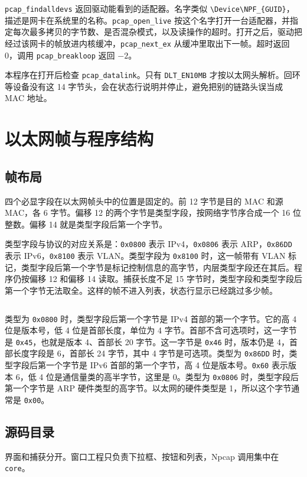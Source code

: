 \documentclass[10.5pt,a4paper,UTF8]{article}
\begin{document}
\texttt{pcap\_findalldevs} 返回驱动能看到的适配器。名字类似 \texttt{\textbackslash Device\textbackslash NPF\_\{GUID\}}，描述是网卡在系统里的名称。\texttt{pcap\_open\_live} 按这个名字打开一台适配器，并指定每次最多拷贝的字节数、是否混杂模式，以及读操作的超时。打开之后，驱动把经过该网卡的帧放进内核缓冲，\texttt{pcap\_next\_ex} 从缓冲里取出下一帧。超时返回 0，调用 \texttt{pcap\_breakloop} 返回 $-2$。

本程序在打开后检查 \texttt{pcap\_datalink}。只有 \texttt{DLT\_EN10MB} 才按以太网头解析。回环等设备没有这 14 字节头，会在状态行说明并停止，避免把别的链路头误当成 MAC 地址。

\section{以太网帧与程序结构}
\subsection{帧布局}
四个必显字段在以太网帧头中的位置是固定的。前 12 字节是目的 MAC 和源 MAC，各 6 字节。偏移 12 的两个字节是类型字段，按网络字节序合成一个 16 位整数。偏移 14 就是类型字段后第一个字节。

类型字段与协议的对应关系是：\texttt{0x0800} 表示 IPv4，\texttt{0x0806} 表示 ARP，\texttt{0x86DD} 表示 IPv6，\texttt{0x8100} 表示 VLAN。类型字段为 \texttt{0x8100} 时，这一帧带有 VLAN 标记，类型字段后第一个字节是标记控制信息的高字节，内层类型字段还在其后。程序仍按偏移 12 和偏移 14 读取。捕获长度不足 15 字节时，类型字段和类型字段后第一个字节无法取全。这样的帧不进入列表，状态行显示已经跳过多少帧。

\inputminted[firstline=7,lastline=22,linenos,firstnumber=7]{cpp}{core/ethernet.cpp}

类型为 \texttt{0x0800} 时，类型字段后第一个字节是 IPv4 首部的第一个字节。它的高 4 位是版本号，低 4 位是首部长度，单位为 4 字节。首部不含可选项时，这一字节是 \texttt{0x45}，也就是版本 4、首部长 20 字节。这一字节是 \texttt{0x46} 时，版本仍是 4，首部长度字段是 6，首部长 24 字节，其中 4 字节是可选项。类型为 \texttt{0x86DD} 时，类型字段后第一个字节是 IPv6 首部的第一个字节，高 4 位是版本号。\texttt{0x60} 表示版本 6，低 4 位是通信量类的高半字节，这里是 0。类型为 \texttt{0x0806} 时，类型字段后第一个字节是 ARP 硬件类型的高字节。以太网的硬件类型是 1，所以这个字节通常是 \texttt{0x00}。

\subsection{源码目录}
界面和捕获分开。窗口工程只负责下拉框、按钮和列表，Npcap 调用集中在 \texttt{core}。
\end{document}
